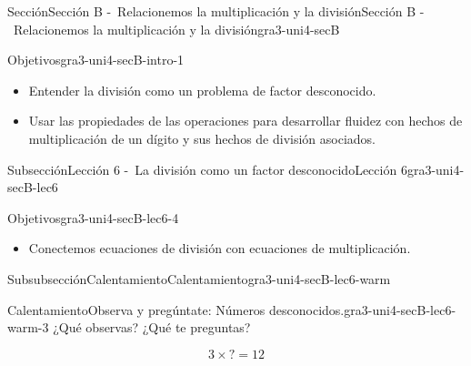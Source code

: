 \documentclass[twoside,14pt,]{extarticle}
\begin{document}
%
%
\typeout{************************************************}
\typeout{************************************************}
%
\begin{sectionptx}{Sección}{Sección B -~Relacionemos la multiplicación y la división}{}{Sección B -~Relacionemos la multiplicación y la división}{}{}{gra3-uni4-secB}
\begin{introduction}{}%
\begin{objectives}{Objetivos}{gra3-uni4-secB-intro-1}
%
\begin{itemize}[label=\textbullet]
\item{}Entender la división como un problema de factor desconocido.%
\item{}Usar las propiedades de las operaciones para desarrollar fluidez con hechos de multiplicación de un dígito y sus hechos de división asociados.%
\end{itemize}
\end{objectives}
\end{introduction}%
%
%
\typeout{************************************************}
\typeout{************************************************}
%
\begin{subsectionptx}{Subsección}{Lección 6 -~La división como un factor desconocido}{}{Lección 6}{}{}{gra3-uni4-secB-lec6}
\begin{objectives}{Objetivos}{gra3-uni4-secB-lec6-4}
%
\begin{itemize}[label=\textbullet]
\item{}Conectemos ecuaciones de división con ecuaciones de multiplicación.%
\end{itemize}
\end{objectives}
%
%
\typeout{************************************************}
\typeout{************************************************}
%
\begin{subsubsectionptx}{Subsubsección}{Calentamiento}{}{Calentamiento}{}{}{gra3-uni4-secB-lec6-warm}
\begin{exploration}{Calentamiento}{Observa y pregúntate: Números desconocidos.}{gra3-uni4-secB-lec6-warm-3}%
¿Qué observas? ¿Qué te preguntas?%
\begin{sidebyside}{2}{0}{0}{0}%
\begin{sbspanel}{0.5}%
%
\begin{equation*}
3\times {?} =12
\end{equation*}

\end{sbspanel}
\end{sidebyside}
\end{exploration}
\end{subsubsectionptx}
\end{subsectionptx}
\end{sectionptx}
\end{document}
